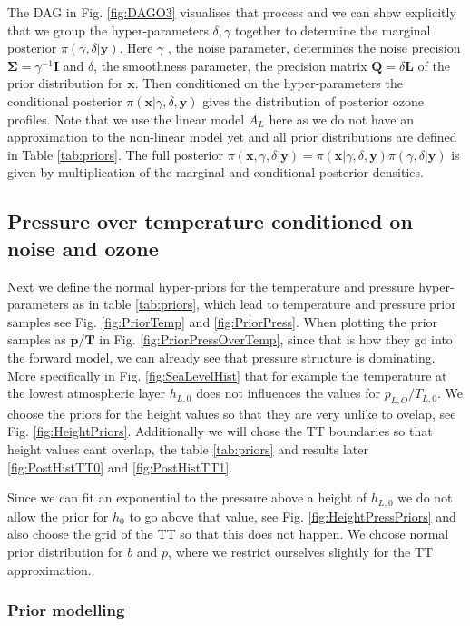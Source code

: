 The DAG in Fig. \ref{fig:DAGO3} visualises that process and we can show explicitly that we group the hyper-parameters $\delta, \gamma$ together to determine the marginal posterior $\pi(\gamma, \delta | \bm{y})$.
Here $\gamma$ , the noise parameter, determines the noise precision $\bm{\Sigma} = \gamma ^{-1} \bm{I}$ and $\delta$, the smoothness parameter, the precision matrix $\bm{Q} = \delta \bm{L}$ of the prior distribution for $\bm{x}$.
Then conditioned on the hyper-parameters the conditional posterior $\pi( \bm{x} |\gamma, \delta, \bm{y})$ gives the distribution of posterior ozone profiles.
Note that we use the linear model $A_L$ here as we do not have an approximation to the non-linear model yet and all prior distributions are defined in Table \ref{tab:priors}.
The full posterior $\pi(\bm{x},\gamma, \delta | \bm{y}) =  \pi(\bm{x}|\gamma, \delta ,\bm{y}) \pi(\gamma, \delta | \bm{y}) $ is given by multiplication of the marginal and conditional posterior densities. 


\subsection{Pressure over temperature conditioned on noise and ozone}
Next we define the normal hyper-priors for the temperature and pressure hyper-parameters as in table \ref{tab:priors}, which lead to temperature and pressure prior samples see Fig. \ref{fig:PriorTemp} and \ref{fig:PriorPress}.
When plotting the prior samples as $\bm{p} / \bm{T}$ in Fig. \ref{fig:PriorPressOverTemp}, since that is how they go into the forward model, we can already see that pressure structure is dominating.
More specifically in Fig. \ref{fig:SeaLevelHist} that for example the temperature at the lowest atmospheric layer $h_{L,0}$ does not influences the values for $p_{L,O}/T_{L,0}$.
We choose the priors for the height values so that they are very unlike to ovelap, see Fig. \ref{fig:HeightPriors}.
Additionally we will chose the TT boundaries so that height values cant overlap, the table \ref{tab:priors} and results later \ref{fig:PostHistTT0} and \ref{fig:PostHistTT1}.

Since we can fit an exponential to the pressure above a height of $h_{L,0}$ we do not allow the prior for $h_0$ to go above that value, see Fig. \ref{fig:HeightPressPriors} and also choose the grid of the TT so that this does not happen.
We choose normal prior distribution for $b$ and $p$, where we restrict ourselves slightly for the TT approximation.
\subsubsection{Prior modelling}

